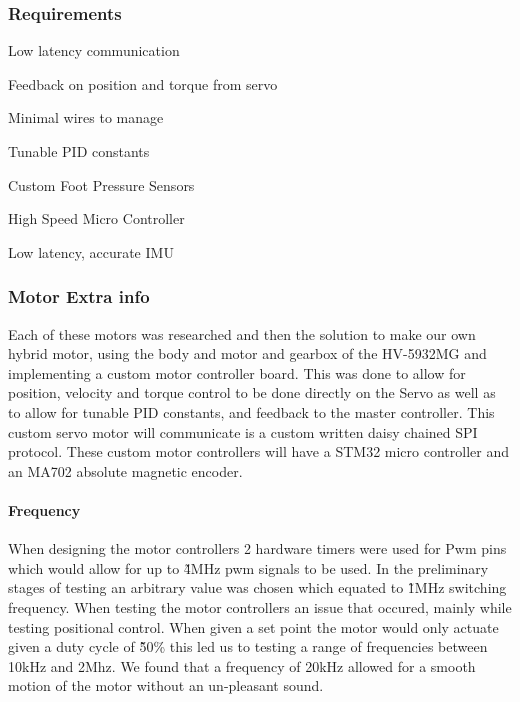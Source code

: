         \subsubsection{Requirements}
            \begin{Deliverables} %
                \item Low latency communication
                \item Feedback on position and torque from servo
                \item Minimal wires to manage
                \item Tunable PID constants
                \item Custom Foot Pressure Sensors
                \item High Speed Micro Controller
                \item Low latency, accurate IMU
            \end{Deliverables}

        \subsubsection{Motor Extra info}
        Each of these motors was researched and then the solution to make our own hybrid motor, using the body and motor and gearbox of the HV-5932MG and implementing a custom motor controller board. This was done to allow for position, velocity and torque control to be done directly on the Servo as well as to allow for tunable PID constants, and feedback to the master controller. This custom servo motor will communicate is a custom written daisy chained SPI protocol. These custom motor controllers will have a STM32 micro controller and an MA702 absolute magnetic encoder\cite{MA702}.
        \paragraph{Frequency}
        When designing the motor controllers 2 hardware timers were used for Pwm pins which would allow for up to \~4MHz pwm signals to be used. In the preliminary stages of testing an arbitrary value was chosen which equated to \~1MHz switching frequency. When testing the motor controllers an issue that occured, mainly while testing positional control. When given a set point the motor would only actuate given a duty cycle of  \~50\% this led us to testing a range of frequencies between 10kHz and 2Mhz. We found that a frequency of 20kHz allowed for a smooth motion of the motor without an un-pleasant sound.  
